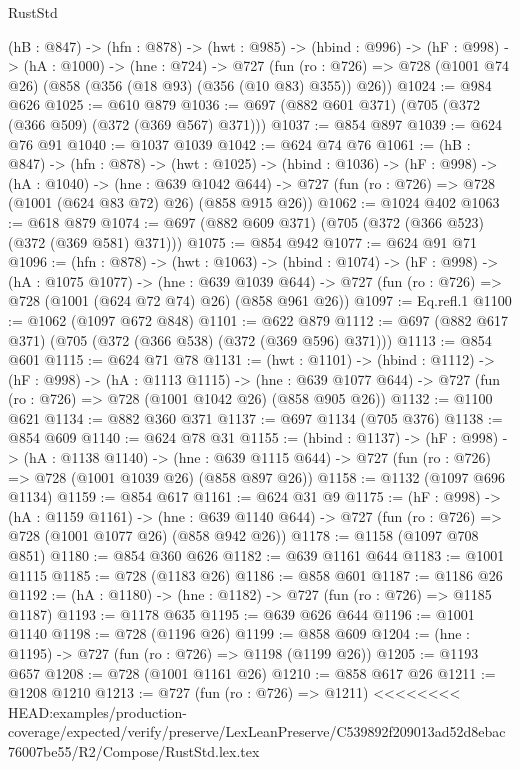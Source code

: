 \begin{lexlean}{RustStd}
\begin{coremodule}
{\begin{coremodule}
  (hB : @847) ->
  (hfn : @878) ->
  (hwt : @985) ->
  (hbind : @996) ->
  (hF : @998) ->
  (hA : @1000) ->
  (hne : @724) ->
  @727 (fun (ro : @726) => @728 (@1001 @74 @26) (@858 (@356 (@18 @93) (@356 (@10 @83) @355)) @26))
@1024 := @984 @626
@1025 := @610 @879
@1036 := @697 (@882 @601 @371) (@705 (@372 (@366 @509) (@372 (@369 @567) @371)))
@1037 := @854 @897
@1039 := @624 @76 @91
@1040 := @1037 @1039
@1042 := @624 @74 @76
@1061 := (hB : @847) ->
  (hfn : @878) ->
  (hwt : @1025) ->
  (hbind : @1036) ->
  (hF : @998) ->
  (hA : @1040) ->
  (hne : @639 @1042 @644) ->
  @727 (fun (ro : @726) => @728 (@1001 (@624 @83 @72) @26) (@858 @915 @26))
@1062 := @1024 @402
@1063 := @618 @879
@1074 := @697 (@882 @609 @371) (@705 (@372 (@366 @523) (@372 (@369 @581) @371)))
@1075 := @854 @942
@1077 := @624 @91 @71
@1096 := (hfn : @878) ->
  (hwt : @1063) ->
  (hbind : @1074) ->
  (hF : @998) ->
  (hA : @1075 @1077) ->
  (hne : @639 @1039 @644) ->
  @727 (fun (ro : @726) => @728 (@1001 (@624 @72 @74) @26) (@858 @961 @26))
@1097 := Eq.refl.{1}
@1100 := @1062 (@1097 @672 @848)
@1101 := @622 @879
@1112 := @697 (@882 @617 @371) (@705 (@372 (@366 @538) (@372 (@369 @596) @371)))
@1113 := @854 @601
@1115 := @624 @71 @78
@1131 := (hwt : @1101) ->
  (hbind : @1112) ->
  (hF : @998) ->
  (hA : @1113 @1115) ->
  (hne : @639 @1077 @644) -> @727 (fun (ro : @726) => @728 (@1001 @1042 @26) (@858 @905 @26))
@1132 := @1100 @621
@1134 := @882 @360 @371
@1137 := @697 @1134 (@705 @376)
@1138 := @854 @609
@1140 := @624 @78 @31
@1155 := (hbind : @1137) ->
  (hF : @998) ->
  (hA : @1138 @1140) ->
  (hne : @639 @1115 @644) -> @727 (fun (ro : @726) => @728 (@1001 @1039 @26) (@858 @897 @26))
@1158 := @1132 (@1097 @696 @1134)
@1159 := @854 @617
@1161 := @624 @31 @9
@1175 := (hF : @998) ->
  (hA : @1159 @1161) ->
  (hne : @639 @1140 @644) -> @727 (fun (ro : @726) => @728 (@1001 @1077 @26) (@858 @942 @26))
@1178 := @1158 (@1097 @708 @851)
@1180 := @854 @360 @626
@1182 := @639 @1161 @644
@1183 := @1001 @1115
@1185 := @728 (@1183 @26)
@1186 := @858 @601
@1187 := @1186 @26
@1192 := (hA : @1180) -> (hne : @1182) -> @727 (fun (ro : @726) => @1185 @1187)
@1193 := @1178 @635
@1195 := @639 @626 @644
@1196 := @1001 @1140
@1198 := @728 (@1196 @26)
@1199 := @858 @609
@1204 := (hne : @1195) -> @727 (fun (ro : @726) => @1198 (@1199 @26))
@1205 := @1193 @657
@1208 := @728 (@1001 @1161 @26)
@1210 := @858 @617 @26
@1211 := @1208 @1210
@1213 := @727 (fun (ro : @726) => @1211)
<<<<<<<< HEAD:examples/production-coverage/expected/verify/preserve/LexLeanPreserve/C539892f209013ad52d8ebac76007be55/R2/Compose/RustStd.lex.tex

\end{coremodule}}
\end{coremodule}
\end{lexlean}
